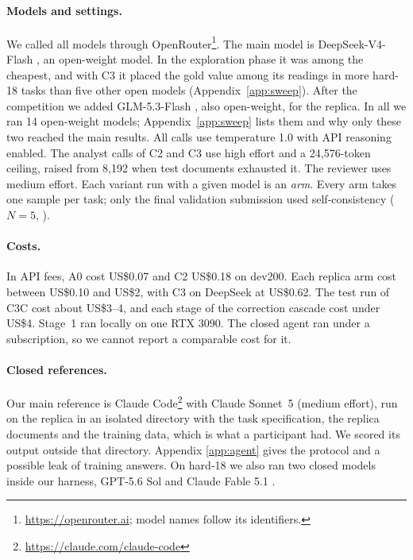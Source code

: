 \documentclass[11pt]{article}%
\begin{document}
\paragraph{Models and settings.} We called all models through OpenRouter\footnote{\url{https://openrouter.ai}; model names follow its
identifiers.}. The main model is DeepSeek-V4-Flash \citep{deepseek2026v4}, an
open-weight model. In the exploration phase it
was among the cheapest, and with \textsc{C3} it placed the gold value among
its readings in more hard-18 tasks than five other open models
(Appendix~\ref{app:sweep}). After the competition we added GLM-5.3-Flash \citep{glm2026glm5}, also
open-weight, for the replica. In all we ran 14 open-weight models;
Appendix~\ref{app:sweep} lists them and why only these two reached the main
results. All calls use temperature 1.0 with API
reasoning enabled. The analyst calls of \textsc{C2} and \textsc{C3} use high
effort and a 24{,}576-token ceiling, raised from 8{,}192 when test documents
exhausted it. The reviewer uses medium effort. Each variant run with a given model is an \emph{arm}. Every arm takes one sample per task; only the
final validation submission used self-consistency ($N{=}5$,
\citealp{wang2023selfconsistency}).

\paragraph{Costs.} In API fees, \textsc{A0} cost US\$0.07 and \textsc{C2}
US\$0.18 on dev200. Each replica arm cost between US\$0.10 and US\$2, with
\textsc{C3} on DeepSeek at US\$0.62. The test run of \textsc{C3C} cost about
US\$3--4, and each stage of the correction cascade cost under US\$4. Stage~1
ran locally on one RTX 3090. The closed agent ran under a subscription, so we
cannot report a comparable cost for it.

\paragraph{Closed references.} Our main reference is Claude
Code\footnote{\url{https://claude.com/claude-code}} with Claude Sonnet~5 \citep{anthropic2026sonnet5}
(medium effort), run on the replica in an isolated directory with the task
specification, the replica documents and the training data, which is what a
participant had. We scored its output outside that directory. Appendix
\ref{app:agent} gives the protocol and a possible leak of training answers. On hard-18 we also ran two closed models
inside our harness, GPT-5.6 Sol and Claude Fable 5.1 \citep{anthropic2026fable51}.
\end{document}
